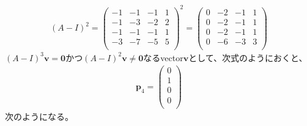 \documentclass[dvipdfmx]{jsarticle}
\begin{document}
\begin{align*}
(A - I)^{2} = \begin{pmatrix}
 - 1 & - 1 & - 1 & 1 \\
 - 1 & - 3 & - 2 & 2 \\
 - 1 & - 1 & - 1 & 1 \\
 - 3 & - 7 & - 5 & 5 \\
\end{pmatrix}^{2} = \begin{pmatrix}
0 & - 2 & - 1 & 1 \\
0 & - 2 & - 1 & 1 \\
0 & - 2 & - 1 & 1 \\
0 & - 6 & - 3 & 3 \\
\end{pmatrix}
\end{align*}
$(A - I)^{3}\mathbf{v} = \mathbf{0}$かつ$(A - I)^{2}\mathbf{v} \neq \mathbf{0}$なるvector$\mathbf{v}$として、次式のようにおくと、
\begin{align*}
\mathbf{p}_{4} = \begin{pmatrix}
0 \\
1 \\
0 \\
0 \\
\end{pmatrix}
\end{align*}
次のようになる。
\end{document}
